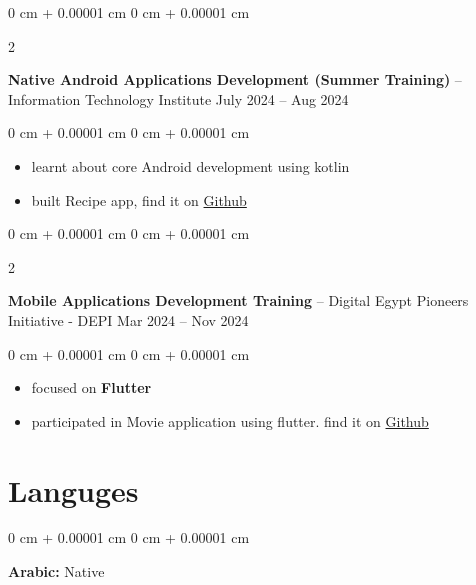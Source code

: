 \documentclass[10pt, letterpaper]{article}
\newenvironment{highlights}{
    \begin{itemize}[
        topsep=0.10 cm,
        parsep=0.10 cm,
        partopsep=0pt,
        itemsep=0pt,
        leftmargin=0 cm + 10pt
    ]
}{
    \end{itemize}
} %
\newenvironment{onecolentry}{
    \begin{adjustwidth}{
        0 cm + 0.00001 cm
    }{
        0 cm + 0.00001 cm
    }
}{
    \end{adjustwidth}
} %
\newenvironment{twocolentry}[2][]{
    \onecolentry
    \def\secondColumn{#2}
    \setcolumnwidth{\fill, 4.5 cm}
    \begin{paracol}{2}
}{
    \switchcolumn \raggedleft \secondColumn
    \end{paracol}
    \endonecolentry
} %
\begin{document}
        \vspace{0.2 cm}

        \begin{twocolentry}{
            July 2024 – Aug 2024
        }
            \textbf{Native Android Applications Development (Summer Training)} -- Information Technology Institute\end{twocolentry}

        \vspace{0.10 cm}
        \begin{onecolentry}
            \begin{highlights}
                \item learnt about core Android development using kotlin
                \item built Recipe app, find it on \href{https://github.com/ahmedtelbani/RecipeApp}{Github}
            \end{highlights}
        \end{onecolentry}


        \vspace{0.2 cm}

        \begin{twocolentry}{
            Mar 2024 – Nov 2024
        }
            \textbf{Mobile Applications Development Training} -- Digital Egypt Pioneers Initiative - DEPI\end{twocolentry}

        \vspace{0.10 cm}
        \begin{onecolentry}
            \begin{highlights}
                \item focused on \textbf{Flutter}
                \item participated in Movie application using flutter. find it on \href{https://github.com/andrrew24/depi_final_project}{Github}
            \end{highlights}
        \end{onecolentry}



    
    \section{Languges}



        
        \begin{onecolentry}
            \textbf{Arabic:} Native
        \end{onecolentry}
\end{document}
